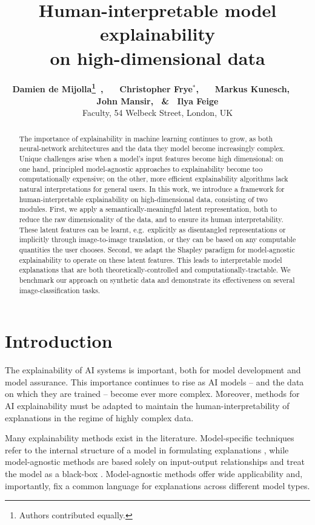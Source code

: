 \documentclass{article}
\title{Human-interpretable model explainability\\on high-dimensional data}
\author{%
\textbf{Damien de Mijolla\thanks{Authors contributed equally.}~, ~~ Christopher Frye$^*$\!, ~~ Markus Kunesch, ~~ John Mansir, ~\&~ Ilya Feige} \\[15pt]
Faculty, 54 Welbeck Street, London, UK
}
\begin{document}
\maketitle

\begin{abstract}
%
The importance of explainability in machine learning continues to grow, as both neural-network architectures and the data they model become increasingly complex. 
%
Unique challenges arise when a model's input features become high dimensional: on one hand, principled model-agnostic approaches to explainability become too computationally expensive; on the other, more efficient explainability algorithms lack natural interpretations for general users.
%
In this work, we introduce a framework for human-interpretable explainability on high-dimensional data, consisting of two modules.
%
First, we apply a semantically-meaningful latent representation, both to reduce the raw dimensionality of the data, and to ensure its human interpretability.
%
These latent features can be learnt, e.g.~explicitly as disentangled representations or implicitly through image-to-image translation, or they can be based on any computable quantities the user chooses.
%
Second, we adapt the Shapley paradigm for model-agnostic explainability to operate on these latent features. 
%
This leads to interpretable model explanations that are both theoretically-controlled and computationally-tractable.
%
We benchmark our approach on synthetic data and demonstrate its effectiveness on several image-classification tasks. 
%
\end{abstract}


\section{Introduction}
\label{sec:intro}


The explainability of AI systems is important, both for model development and model assurance. This importance continues to rise as AI models -- and the data on which they are trained -- become ever more complex. Moreover, methods for AI explainability must be adapted to maintain the human-interpretability of explanations in the regime of highly complex data.

Many explainability methods exist in the literature. Model-specific techniques refer to the internal structure of a model in formulating explanations \citep{chen2016xgboost, shrikumar2017learning}, while model-agnostic methods are based solely on input-output relationships and treat the model as a black-box \citep{breiman2001random, LIME}. Model-agnostic methods offer wide applicability and, importantly, fix a common language for explanations across different model types. 
    
\end{document}
